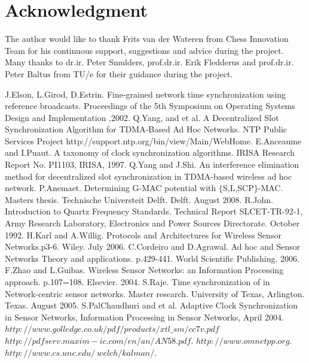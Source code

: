 \documentclass[journal]{IEEEtran}
\begin{document}
\section{\textbf{Acknowledgment}}\noindent The author would like to thank Frits van der Wateren from Chess Innovation Team for his continuous support, suggestions and advice during the project. Many thanks to dr.ir. Peter Smulders, prof.dr.ir. Erik Fledderus and prof.dr.ir. Peter Baltus from TU/e for their guidance during the project.
\begin{thebibliography}{\textbf{References}}
J.Elson, L.Girod, D.Estrin. Fine-grained network time synchronization using reference broadcasts. Proceedings of the 5th Symposium on Operating Systems Design and Implementation ,2002.
Q.Yang, and et al. A Decentralized Slot Synchronization Algorithm for TDMA-Based Ad Hoc Networks.
NTP Public Services Project http://support.ntp.org/bin/view/Main/WebHome.
E.Anceaume and I.Puaut. A taxonomy of clock synchronization algorithms. IRISA Research Report No. PI1103, IRISA, 1997.
Q.Yang and J.Shi. An interference elimination method for decentralized slot synchronization in TDMA-based wireless ad hoc network.
 P.Anemaet. Determining G-MAC potential with $\{$S,L,SCP$\}$-MAC. Masters thesis. Technische Universteit Delft. Delft. August 2008.
R.John. Introduction to Quartz Frequency Standards. Technical Report SLCET-TR-92-1, Army Research Laboratory,
Electronics and Power Sources Directorate. October 1992.
H.Karl and A.Willig. Protocols and Architectures for Wireless Sensor Networks.p3-6. Wiley. July 2006.
C.Cordeiro and D.Agrawal. Ad hoc and Sensor Networks Theory and applications. p.429-441. World Scientific Publishing. 2006.
F.Zhao and  L.Guibas. Wireless Sensor Networks: an Information Processing approach. p.107=108. Elsevier. 2004.
 S.Raje. Time synchronization of in Network-centric sensor networks. Master research. University of Texas, Arlington. Texas. August 2005.
S.PalChaudhuri and et al. Adaptive Clock Synchronization in Sensor Networks, Information Processing in Sensor Networks, April 2004.
 $http://www.golledge.co.uk/pdf/products/xtl\_sm/cc7v.pdf$
 $http://pdfserv.maxim-ic.com/en/an/AN58.pdf$.
$http://www.omnetpp.org$.
$http://www.cs.unc.edu/~welch/kalman/$.
\end{thebibliography}
\end{document}
